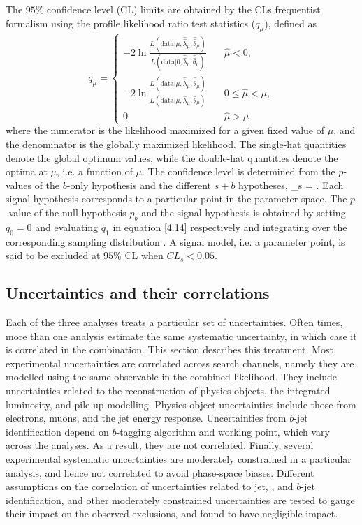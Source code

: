 The $95\%$ confidence level (CL) limits are obtained by the CLs frequentist formalism \cite{ReadCLs} using the profile likelihood ratio test statistics ($q_{\mu}$)\cite{Cowan:2010js}, defined as 
\begin{equation}
    \label{4.14}
    q_{\mu} = \begin{cases} 
     -2\ln\frac{L(\mathrm{data}|\mu,\hat{\hat{\lambda}}_{\mu},\hat{\hat{\theta}}_{\mu})}{L(\mathrm{data}|0,\hat{\hat{\lambda}}_{0},\hat{\hat{\theta}}_{0})}\quad &  \hat{\mu}<0, \\
        -2\ln\frac{L(\mathrm{data}|\mu,\hat{\hat{\lambda}}_{\mu},\hat{\hat{\theta}}_{\mu})}{L(\mathrm{data}|\hat{\mu},\hat{\lambda}_{\mu},\hat{\theta}_{\mu})}\quad & 0\le \hat{\mu}<\mu, \\
        0 \quad & \hat{\mu} > \mu
    \end{cases}
\end{equation}
where the numerator is the likelihood maximized for a given fixed value of $\mu$, and the denominator is the globally maximized likelihood. The single-hat quantities denote the global optimum values, while the double-hat quantities denote the optima at $\mu$, i.e. a function of $\mu$.
The confidence level is determined from the $p$-values of the $b$-only hypothesis and the different $s+b$ hypotheses,
\beq
\label{chap:phys-ana:15}
_s = .
\eeq
Each signal hypothesis corresponds to a particular point in the parameter space.
The $p$-value of the null hypothesis $p_b$ and the signal hypothesis is obtained by setting $q_0=0$ and evaluating $q_1$ in equation \eqref{4.14} respectively and integrating over the corresponding sampling distribution \cite{Cowan:2010js}.
A signal model, i.e. a parameter point, is said to be excluded at $95\%$ CL when $CL_s<0.05$. 


\subsection{Uncertainties and their correlations}

Each of the three analyses treats a particular set of uncertainties. 
Often times, more than one analysis estimate the same systematic uncertainty, in which case it is correlated in the combination. 
This section describes this treatment. 
Most experimental uncertainties are correlated across search channels, namely they are modelled using the same observable in the combined likelihood. 
They include uncertainties related to the reconstruction of physics objects, the integrated luminosity, and pile-up modelling. 
Physics object uncertainties include those from electrons, muons, and the jet energy response. 
Uncertainties from $b$-jet identification depend on $b$-tagging algorithm and working point, which vary across the analyses. 
As a result, they are not correlated. 
Finally, several experimental systematic uncertainties are moderately constrained in a particular analysis, and hence not correlated to avoid phase-space biases. 
Different assumptions on the correlation of uncertainties related to jet, \met, and $b$-jet identification, and other moderately constrained uncertainties are tested to gauge their impact on the observed exclusions, and found to have negligible impact. 

